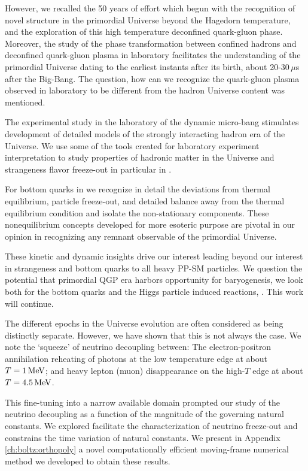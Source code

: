 However, we recalled the 50 years of effort which begun with the recognition of novel structure in the primordial Universe beyond the Hagedorn temperature, and the exploration of this high temperature deconfined quark-gluon phase. Moreover, the study of the phase transformation between confined hadrons and deconfined quark-gluon plasma in laboratory facilitates the understanding of the primordial Universe dating to the earliest instants after its birth, about 20-30\,$\mu$s after the Big-Bang. The question, how can we recognize the quark-gluon plasma observed in laboratory to be different from the hadron Universe content was mentioned. 

The experimental study in the laboratory  of the dynamic micro-bang stimulates development of detailed models of the strongly interacting hadron era of the Universe. We use some of the  tools created for laboratory experiment interpretation to study properties of hadronic matter in the Universe and strangeness flavor freeze-out in particular in .  

For bottom quarks in  we recognize in detail the deviations from thermal equilibrium, particle freeze-out, and detailed balance away from the thermal equilibrium condition and isolate the non-stationary components. These nonequilibrium concepts developed for more esoteric purpose are pivotal in our opinion in recognizing any remnant observable of the primordial Universe. 

These kinetic and dynamic insights drive our interest leading beyond our interest in strangeness and bottom quarks to all heavy PP-SM particles. We question the potential that primordial QGP era harbors opportunity  for baryogenesis, we look both for the bottom quarks and the Higgs particle induced reactions, . This work will continue.

The different epochs in the Universe evolution are often considered as being distinctly separate. However, we have shown that this is not always the case. We note the `squeeze' of neutrino decoupling between: The electron-positron annihilation reheating of photons at the low temperature edge at about $T=1\text{\,MeV}$; and heavy lepton (muon) disappearance on the high-$T$ edge at about $T=4.5\text{\,MeV}$. 

This fine-tuning into a narrow available domain prompted our study of the neutrino decoupling as a function of the magnitude of the governing natural constants. We explored facilitate the characterization of neutrino freeze-out and constrains the time variation of natural constants. We present  in Appendix \ref{ch:boltz:orthopoly} a novel computationally efficient moving-frame numerical method we developed to obtain these results.

